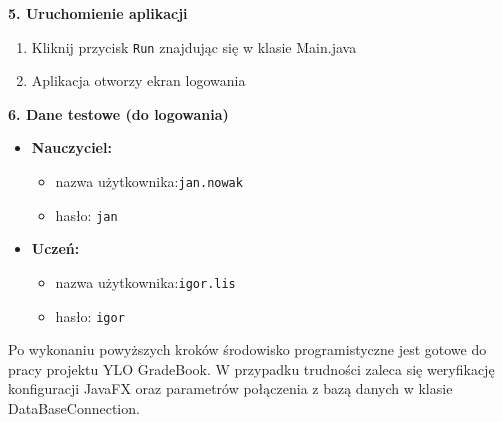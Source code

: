 \vspace{6pt}
\textbf{5. Uruchomienie aplikacji}

\begin{enumerate}
    \item Kliknij przycisk \texttt{Run} znajdując się w klasie Main.java
    \item Aplikacja otworzy ekran logowania
\end{enumerate}

\vspace{6pt}
\textbf{6. Dane testowe (do logowania)}

\begin{itemize}
    \item \textbf{Nauczyciel:} 
    \begin{itemize}
    \item nazwa użytkownika:\texttt{jan.nowak} 
    \item hasło: \texttt{jan}
    \end{itemize}
    \item \textbf{Uczeń:} 
    \begin{itemize}
    \item nazwa użytkownika:\texttt{igor.lis} 
    \item hasło: \texttt{igor}
    \end{itemize}
\end{itemize}


\vspace{6pt}
Po wykonaniu powyższych kroków środowisko programistyczne jest gotowe do pracy projektu YLO GradeBook. W przypadku trudności zaleca się weryfikację konfiguracji JavaFX oraz parametrów połączenia z bazą danych w klasie DataBaseConnection.